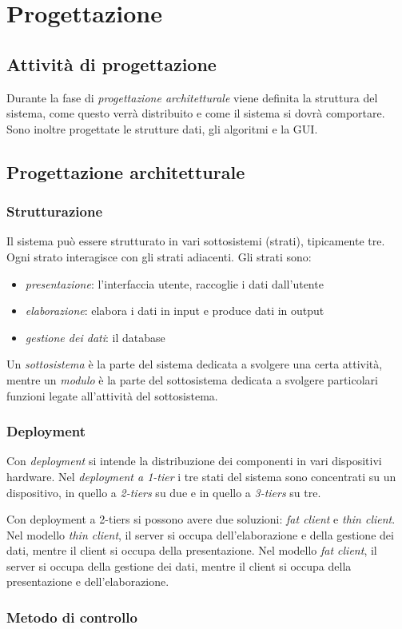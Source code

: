 \documentclass[11pt]{article}
\begin{document}
\section{Progettazione}
\subsection{Attività di progettazione}
Durante la fase di \textit{progettazione architetturale} viene definita la struttura del sistema, come questo verrà 
distribuito e come il sistema si dovrà comportare. Sono inoltre progettate le strutture dati, gli algoritmi e la GUI.
\subsection{Progettazione architetturale}
\subsubsection*{Strutturazione}
Il sistema può essere strutturato in vari sottosistemi (strati), tipicamente tre. Ogni strato interagisce con gli strati 
adiacenti. Gli strati sono:
\begin{itemize}
    \item \textit{presentazione}: l'interfaccia utente, raccoglie i dati dall'utente
    \item \textit{elaborazione}:  elabora i dati in input e produce dati in output
    \item \textit{gestione dei dati}: il database
\end{itemize}

Un \textit{sottosistema} è la parte del sistema dedicata a svolgere una certa attività, mentre un \textit{modulo} è la 
parte del sottosistema dedicata a svolgere particolari funzioni legate all'attività del sottosistema.
\subsubsection*{Deployment}
Con \textit{deployment} si intende la distribuzione dei componenti in vari dispositivi hardware. Nel \textit{deployment 
a 1-tier} i tre stati del sistema sono concentrati su un dispositivo, in quello a \textit{2-tiers} su due e in quello a 
\textit{3-tiers} su tre.

Con deployment a 2-tiers si possono avere due soluzioni: \textit{fat client} e \textit{thin client}.
Nel modello \textit{thin client}, il server si occupa dell'elaborazione e della gestione dei dati, mentre il client si 
occupa della presentazione.
Nel modello \textit{fat client}, il server si occupa della gestione dei dati, mentre il client si occupa della presentazione 
e dell'elaborazione.
\subsubsection*{Metodo di controllo}
\end{document}
